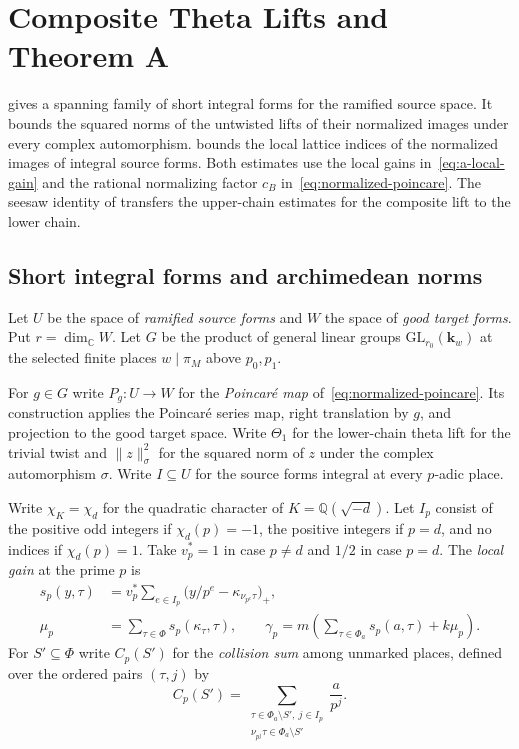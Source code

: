 \chapter{Composite Theta Lifts and Theorem A}
\label{chap:upperbound}

\begin{chapterguide}
 gives a spanning family of short integral forms for the ramified source space. It bounds the squared norms of the untwisted lifts of their normalized images under every complex automorphism.  bounds the local lattice indices of the normalized images of integral source forms. Both estimates use the local gains in~\eqref{eq:a-local-gain} and the rational normalizing factor $c_B$ in~\eqref{eq:normalized-poincare}. The seesaw identity of  transfers the upper-chain estimates for the composite lift to the lower chain.
\end{chapterguide}

\section{Short integral forms and archimedean norms}
\label{sec:a-short-basis}

Let $U$ be the space of \emph{ramified source forms} and $W$ the space of \emph{good target forms}. Put $r=\dim_{\mathbb C}W$. Let $G$ be the product of general linear groups $\mathrm{GL}_{r_0}(\mathbf k_w)$ at the selected finite places $w\mid\pi_M$ above $p_0,p_1$.

For $g\in G$ write $P_g\colon U\to W$ for the \emph{Poincaré map} of~\eqref{eq:normalized-poincare}. Its construction applies the Poincaré series map, right translation by $g$, and projection to the good target space. Write $\Theta_1$ for the lower-chain theta lift for the trivial twist and $\|z\|^2_\sigma$ for the squared norm of $z$ under the complex automorphism $\sigma$. Write $I\subseteq U$ for the source forms integral at every $p$-adic place.

Write $\chi_K=\chi_d$ for the quadratic character of $K=\mathbb Q(\sqrt{-d})$. Let $I_p$ consist of the positive odd integers if $\chi_d(p)=-1$, the positive integers if $p=d$, and no indices if $\chi_d(p)=1$. Take $v_p^*=1$ in case $p\ne d$ and $1/2$ in case $p=d$. The \emph{local gain} at the prime $p$ is
\begin{equation}\label{eq:a-local-gain}
\begin{aligned}
 s_p(y,\tau)&=v_p^*\sum_{e\in I_p}\bigl(y/p^e-\kappa_{\nu_{p^e}\tau}\bigr)_+,\\
 \mu_p&=\sum_{\tau\in\Phi}s_p(\kappa_\tau,\tau),\qquad
 \gamma_p=m\left(\sum_{\tau\in\Phi_a}s_p(a,\tau)+k\mu_p\right).
\end{aligned}
\end{equation}
For $S'\subseteq\Phi$ write $C_p(S')$ for the \emph{collision sum} among unmarked places, defined over the ordered pairs $(\tau,j)$ by
\[
 C_p(S')=\sum_{\substack{\tau\in\Phi_a\setminus S',\ j\in I_p\\
                         \nu_{p^j}\tau\in\Phi_a\setminus S'}}\frac a{p^j}.
\]

